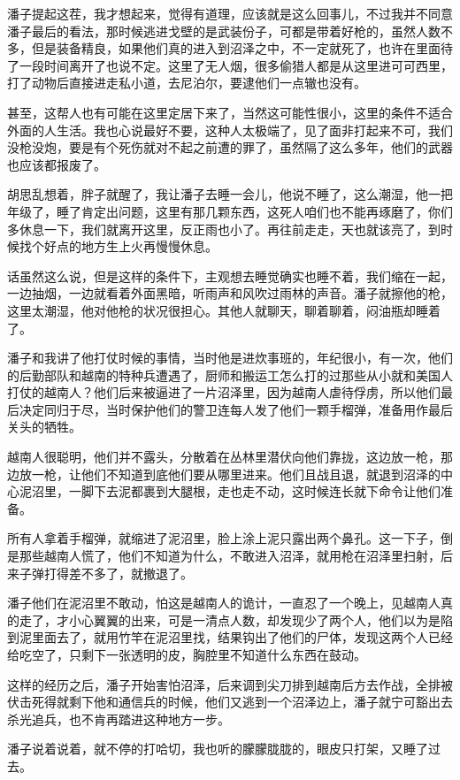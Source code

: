 潘子提起这茬，我才想起来，觉得有道理，应该就是这么回事儿，不过我并不同意潘子最后的看法，那时候逃进戈壁的是武装份子，可都是带着好枪的，虽然人数不多，但是装备精良，如果他们真的进入到沼泽之中，不一定就死了，也许在里面待了一段时间离开了也说不定。这里了无人烟，很多偷猎人都是从这里进可可西里，打了动物后直接进走私小道，去尼泊尔，要逮他们一点辙也没有。

甚至，这帮人也有可能在这里定居下来了，当然这可能性很小，这里的条件不适合外面的人生活。我也心说最好不要，这种人太极端了，见了面非打起来不可，我们没枪没炮，要是有个死伤就对不起之前遭的罪了，虽然隔了这么多年，他们的武器也应该都报废了。

胡思乱想着，胖子就醒了，我让潘子去睡一会儿，他说不睡了，这么潮湿，他一把年级了，睡了肯定出问题，这里有那几颗东西，这死人咱们也不能再琢磨了，你们多休息一下，我们就离开这里，反正雨也小了。再往前走走，天也就该亮了，到时候找个好点的地方生上火再慢慢休息。

话虽然这么说，但是这样的条件下，主观想去睡觉确实也睡不着，我们缩在一起，一边抽烟，一边就看着外面黑暗，听雨声和风吹过雨林的声音。潘子就擦他的枪，这里太潮湿，他对他枪的状况很担心。其他人就聊天，聊着聊着，闷油瓶却睡着了。

潘子和我讲了他打仗时候的事情，当时他是进炊事班的，年纪很小，有一次，他们的后勤部队和越南的特种兵遭遇了，厨师和搬运工怎么打的过那些从小就和美国人打仗的越南人？他们后来被逼进了一片沼泽里，因为越南人虐待俘虏，所以他们最后决定同归于尽，当时保护他们的警卫连每人发了他们一颗手榴弹，准备用作最后关头的牺牲。

越南人很聪明，他们并不露头，分散着在丛林里潜伏向他们靠拢，这边放一枪，那边放一枪，让他们不知道到底他们要从哪里进来。他们且战且退，就退到沼泽的中心泥沼里，一脚下去泥都裹到大腿根，走也走不动，这时候连长就下命令让他们准备。

所有人拿着手榴弹，就缩进了泥沼里，脸上涂上泥只露出两个鼻孔。这一下子，倒是那些越南人慌了，他们不知道为什么，不敢进入沼泽，就用枪在沼泽里扫射，后来子弹打得差不多了，就撤退了。

潘子他们在泥沼里不敢动，怕这是越南人的诡计，一直忍了一个晚上，见越南人真的走了，才小心翼翼的出来，可是一清点人数，却发现少了两个人，他们以为是陷到泥里面去了，就用竹竿在泥沼里找，结果钩出了他们的尸体，发现这两个人已经给吃空了，只剩下一张透明的皮，胸腔里不知道什么东西在鼓动。

这样的经历之后，潘子开始害怕沼泽，后来调到尖刀排到越南后方去作战，全排被伏击死得就剩下他和通信兵的时候，他们又逃到一个沼泽边上，潘子就宁可豁出去杀光追兵，也不肯再踏进这种地方一步。

潘子说着说着，就不停的打哈切，我也听的朦朦胧胧的，眼皮只打架，又睡了过去。

